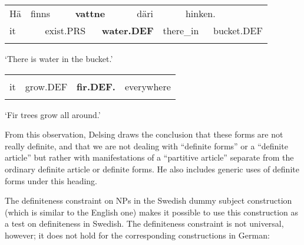 \begin{tabular}{llllllllll}
\lsptoprule
Hä & \multicolumn{2}{l}{finns

} & \multicolumn{2}{l}{{\bfseries vattne}

} & \multicolumn{2}{l}{däri

} & \multicolumn{2}{l}{hinken.

} & \\
\multicolumn{2}{l}{it

} & \multicolumn{2}{l}{exist.PRS

} & \multicolumn{2}{l}{{\bfseries water.DEF}

} & \multicolumn{2}{l}{there\_in

} & \multicolumn{2}{l}{bucket.DEF

}\\
\lspbottomrule
\end{tabular}

\begin{styleTranslation}
‘There is water in the bucket.’

\end{styleTranslation}

\begin{tabular}{llll}
\lsptoprule
\multicolumn{4}{l}{Hä

}\\
it & grow.DEF & {\bfseries fir.DEF.} & everywhere\\
\lspbottomrule
\end{tabular}

\begin{styleTranslation}
‘Fir trees grow all around.’

\end{styleTranslation}

\begin{styleBodyTextFirst}
From this observation, Delsing draws the conclusion that these forms are not really definite, and that we are not dealing with “definite forms” or a “definite article” but rather with manifestations of a “partitive article” separate from the ordinary definite article or definite forms. He also includes generic uses of definite forms under this heading. 

\end{styleBodyTextFirst}

\begin{styleBodytextC}
The definiteness constraint on NPs in the Swedish dummy subject construction (which is similar to the English one) makes it possible to use this construction as a test on definiteness in Swedish. The definiteness constraint is not universal, however; it does not hold for the corresponding constructions in German:

\end{styleBodytextC}


